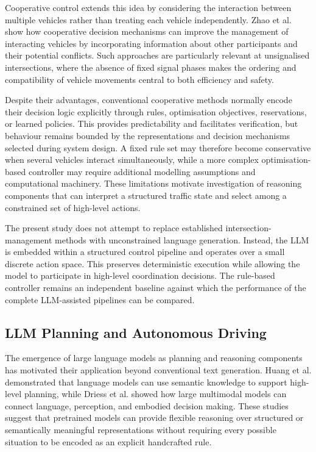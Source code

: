 \documentclass[letterpaper,10pt,conference]{ieeeconf}
\begin{document}
Cooperative control extends this idea by considering the interaction between multiple vehicles rather than treating each vehicle independently. Zhao et al. \cite{Zhao2025} show how cooperative decision mechanisms can improve the management of interacting vehicles by incorporating information about other participants and their potential conflicts. Such approaches are particularly relevant at unsignalised intersections, where the absence of fixed signal phases makes the ordering and compatibility of vehicle movements central to both efficiency and safety.



Despite their advantages, conventional cooperative methods normally encode their decision logic explicitly through rules, optimisation objectives, reservations, or learned policies. This provides predictability and facilitates verification, but behaviour remains bounded by the representations and decision mechanisms selected during system design. A fixed rule set may therefore become conservative when several vehicles interact simultaneously, while a more complex optimisation-based controller may require additional modelling assumptions and computational machinery. These limitations motivate investigation of reasoning components that can interpret a structured traffic state and select among a constrained set of high-level actions.



The present study does not attempt to replace established intersection-management methods with unconstrained language generation. Instead, the LLM is embedded within a structured control pipeline and operates over a small discrete action space. This preserves deterministic execution while allowing the model to participate in high-level coordination decisions. The rule-based controller remains an independent baseline against which the performance of the complete LLM-assisted pipelines can be compared.



\subsection{LLM Planning and Autonomous Driving}



The emergence of large language models as planning and reasoning components has motivated their application beyond conventional text generation. Huang et al. \cite{Huang2022} demonstrated that language models can use semantic knowledge to support high-level planning, while Driess et al. \cite{Driess2023} showed how large multimodal models can connect language, perception, and embodied decision making. These studies suggest that pretrained models can provide flexible reasoning over structured or semantically meaningful representations without requiring every possible situation to be encoded as an explicit handcrafted rule.
\end{document}
